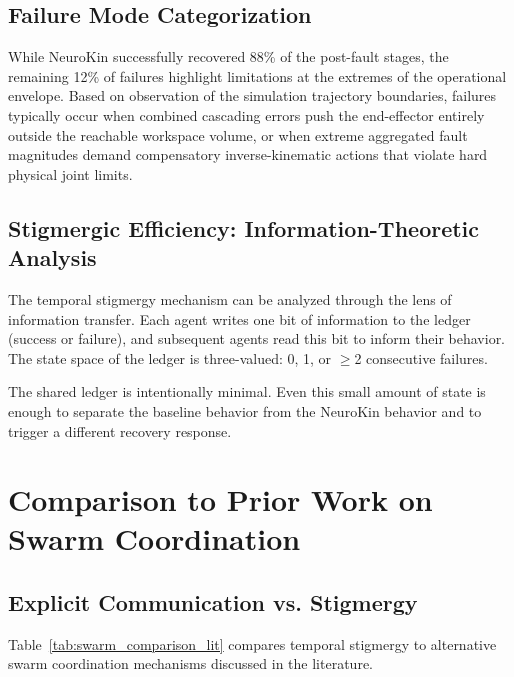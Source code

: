 \documentclass[12pt,a4paper,oneside]{report}
\begin{document}
\subsection{Failure Mode Categorization}
\label{subsec:failure_mode_categorization}

While NeuroKin successfully recovered 88\% of the post-fault stages, the remaining 12\% of failures highlight limitations at the extremes of the operational envelope. Based on observation of the simulation trajectory boundaries, failures typically occur when combined cascading errors push the end-effector entirely outside the reachable workspace volume, or when extreme aggregated fault magnitudes demand compensatory inverse-kinematic actions that violate hard physical joint limits.

\subsection{Stigmergic Efficiency: Information-Theoretic Analysis}
\label{subsec:stigmergic_efficiency_information_theoretic_analysis}

The temporal stigmergy mechanism can be analyzed through the lens of information transfer. Each agent writes one bit of information to the ledger (success or failure), and subsequent agents read this bit to inform their behavior. The state space of the ledger is three-valued: 0, 1, or $\geq$2 consecutive failures.

The shared ledger is intentionally minimal. Even this small amount of state is enough to separate the baseline behavior from the NeuroKin behavior and to trigger a different recovery response.

\section{Comparison to Prior Work on Swarm Coordination}

\subsection{Explicit Communication vs. Stigmergy}
\label{subsec:explicit_communication_vs_stigmergy}

Table~\ref{tab:swarm_comparison_lit} compares temporal stigmergy to alternative swarm coordination mechanisms discussed in the literature.
\end{document}
